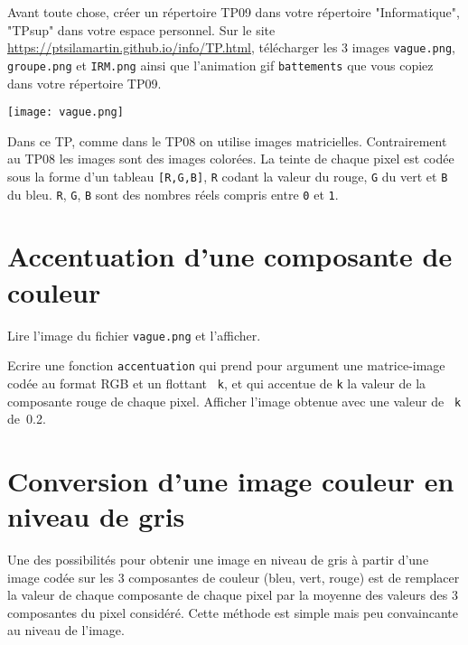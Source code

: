 
Avant toute chose, créer un répertoire TP09 dans votre répertoire "Informatique", "TPsup" dans votre espace personnel. Sur le site \url{https://ptsilamartin.github.io/info/TP.html}, télécharger les 3  images \texttt{vague.png}, \texttt{groupe.png} et \texttt{IRM.png} ainsi que l'animation gif \texttt{battements} que vous copiez dans votre répertoire TP09.

\begin{marginfigure}%
\texttt{[image: vague.png]}
\end{marginfigure}

Dans ce TP, comme dans le TP08 on utilise images matricielles. Contrairement au TP08 les images sont des images colorées. La teinte de chaque pixel est codée sous la forme d'un tableau \lstinline{[R,G,B]}, \lstinline{R} codant la valeur du rouge, \lstinline{G} du vert et \lstinline{B} du bleu. \lstinline{R}, \lstinline{G}, \lstinline{B} sont des nombres réels compris entre \lstinline{0} et \lstinline{1}. 




\section*{Accentuation d'une composante de couleur}
\begin{question}
Lire l'image du fichier \texttt{vague.png} et l'afficher.
\end{question}

\begin{question}
Ecrire une fonction \texttt{accentuation} qui prend pour argument une matrice-image codée au format RGB et un flottant \texttt{ k}, et qui accentue de \texttt{k} la valeur de la composante rouge de chaque pixel. Afficher l'image obtenue avec une valeur de \texttt{ k} de~0.2. 
\end{question}




\section*{Conversion d'une image couleur en niveau de gris}

Une des possibilités pour obtenir une image en niveau de gris à partir d’une image codée sur les 3 composantes de couleur (bleu, vert, rouge) est de remplacer la valeur de chaque composante de chaque pixel par la moyenne des valeurs des 3 composantes du pixel considéré. Cette méthode est simple mais peu convaincante au niveau de l’image.

